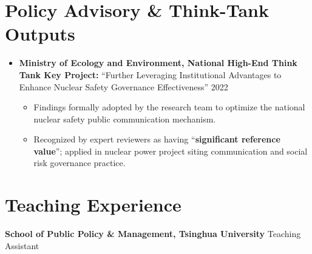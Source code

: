 \documentclass[11pt, a4paper]{article}
\begin{document}
\section{Policy Advisory \& Think-Tank Outputs}

\begin{itemize}
    \item \textbf{Ministry of Ecology and Environment,
    National High-End Think Tank Key Project:}
    ``Further Leveraging Institutional Advantages to Enhance Nuclear Safety
    Governance Effectiveness''
    \hfill 2022
    \begin{itemize}
        \item Findings formally adopted by the research team to optimize the
        national nuclear safety public communication mechanism.
        \item Recognized by expert reviewers as having
        ``\textbf{significant reference value}''; applied in nuclear power
        project siting communication and social risk governance practice.
    \end{itemize}
\end{itemize}

\section{Teaching Experience}
\textbf{School of Public Policy \& Management, Tsinghua University}
\hfill Teaching Assistant
\end{document}
